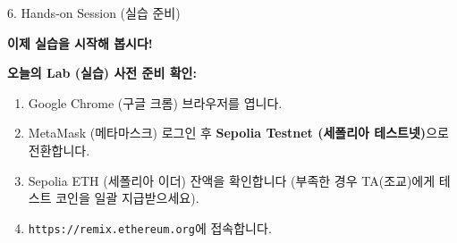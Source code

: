 \documentclass[aspectratio=169]{beamer}
\begin{document}
\begin{frame}{6. Hands-on Session (실습 준비)}
    \begin{center}
        \Large \textbf{이제 실습을 시작해 봅시다!}
    \end{center}
    \vspace{0.5cm}
    \textbf{오늘의 Lab (실습) 사전 준비 확인:}
    \begin{enumerate}
        \item Google Chrome (구글 크롬) 브라우저를 엽니다.
        \item MetaMask (메타마스크) 로그인 후 \textbf{Sepolia Testnet (세폴리아 테스트넷)}으로 전환합니다.
        \item Sepolia ETH (세폴리아 이더) 잔액을 확인합니다 (부족한 경우 TA(조교)에게 테스트 코인을 일괄 지급받으세요).
        \item \texttt{https://remix.ethereum.org}에 접속합니다.
    \end{enumerate}
\end{frame}
\end{document}

